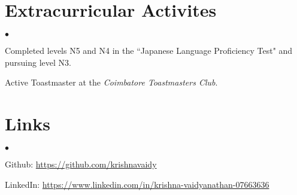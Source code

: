 \documentclass[margin,line]{res}
\newenvironment{list2}{
  \begin{list}{$\bullet$}{%
      \setlength{\itemsep}{0in}
      \setlength{\parsep}{0in} \setlength{\parskip}{0in}
      \setlength{\topsep}{0in} \setlength{\partopsep}{0in} 
      \setlength{\leftmargin}{0.2in}}}{\end{list}}
\begin{document}
\begin{resume}
\section{\sc Extracurricular Activites}
\begin{list2}
\item  Completed levels N5 and N4 in the ``Japanese Language Proficiency Test" and pursuing level N3.
\item Active Toastmaster at the \textit{Coimbatore Toastmasters Club}.
\end{list2}

\section{\sc Links}
\begin{list2}
\item Github: \url{https://github.com/krishnavaidy}
\item LinkedIn: \url{https://www.linkedin.com/in/krishna-vaidyanathan-07663636}
\end{list2}

\end{resume}
\end{document}
